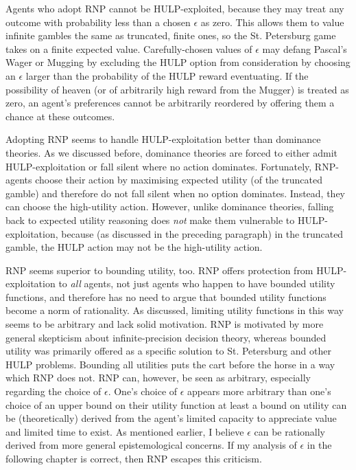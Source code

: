 \documentclass{article}
\begin{document}
Agents who adopt RNP cannot be HULP-exploited, because they may treat any outcome with probability less than a chosen \(\epsilon\) as zero. This allows them to value infinite gambles the same as truncated, finite ones, so the St. Petersburg game takes on a finite expected value. Carefully-chosen values of \(\epsilon\) may defang Pascal's Wager or Mugging by excluding the HULP option from consideration by choosing an \(\epsilon\) larger than the probability of the HULP reward eventuating. If the possibility of heaven (or of arbitrarily high reward from the Mugger) is treated as zero, an agent's preferences cannot be arbitrarily reordered by offering them a chance at these outcomes.

Adopting RNP seems to handle HULP-exploitation better than dominance theories. As we discussed before, dominance theories are forced to either admit HULP-exploitation or fall silent where no action dominates. Fortunately, RNP-agents choose their action by maximising expected utility (of the truncated gamble) and therefore do not fall silent when no option dominates. Instead, they can choose the high-utility action. However, unlike dominance theories, falling back to expected utility reasoning does \textit{not} make them vulnerable to HULP-exploitation, because (as discussed in the preceding paragraph) in the truncated gamble, the HULP action may not be the high-utility action. 

RNP seems superior to bounding utility, too. RNP offers protection from HULP-exploitation to \textit{all} agents, not just agents who happen to have bounded utility functions, and therefore has no need to argue that bounded utility functions become a norm of rationality. As discussed, limiting utility functions in this way seems to be arbitrary and lack solid motivation. RNP is motivated by more general skepticism about infinite-precision decision theory, whereas bounded utility was primarily offered as a specific solution to St. Petersburg and other HULP problems. Bounding all utilities puts the cart before the horse in a way which RNP does not. RNP can, however, be seen as arbitrary, especially regarding the choice of \(\epsilon\). One's choice of \(\epsilon\) appears more arbitrary than one's choice of an upper bound on their utility function \textemdash{} at least a bound on utility can be (theoretically) derived from the agent's limited capacity to appreciate value and limited time to exist. As mentioned earlier, I believe \(\epsilon\) can be rationally derived from more general epistemological concerns. If my analysis of \(\epsilon\) in the following chapter is correct, then RNP escapes this criticism.
\end{document}
